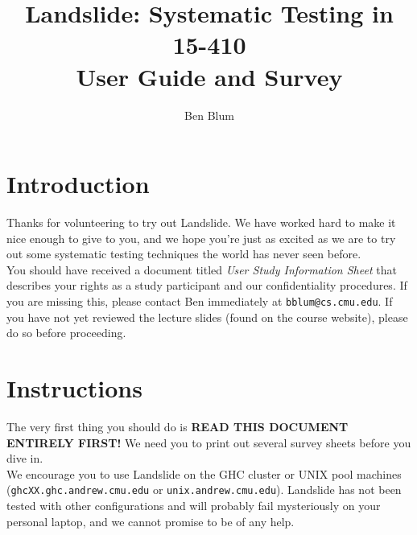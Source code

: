 \documentclass{article}
\begin{document}

\title{\bf Landslide: Systematic Testing in 15-410 \\ User Guide and Survey}
\author{Ben Blum}
\date{}
\maketitle

\section{Introduction}

Thanks for volunteering to try out Landslide. We have worked hard to make it nice enough to give to you, and we hope you're just as excited as we are to try out some systematic testing techniques the world has never seen before.
\\

\noindent You should have received a document titled {\em User Study Information Sheet} that describes your rights as a study participant and our confidentiality procedures. If you are missing this, please contact Ben immediately at {\tt bblum@cs.cmu.edu}. If you have not yet reviewed the lecture slides (found on the course website), please do so before proceeding.

\section{Instructions}

The very first thing you should do is {\bf READ THIS DOCUMENT ENTIRELY FIRST!} We need you to print out several survey sheets before you dive in.
\\

\noindent We encourage you to use Landslide on the GHC cluster or UNIX pool machines ({\tt ghcXX.ghc.andrew.cmu.edu} or {\tt unix.andrew.cmu.edu}). Landslide has not been tested with other configurations and will probably fail mysteriously on your personal laptop, and we cannot promise to be of any help.
\end{document}
